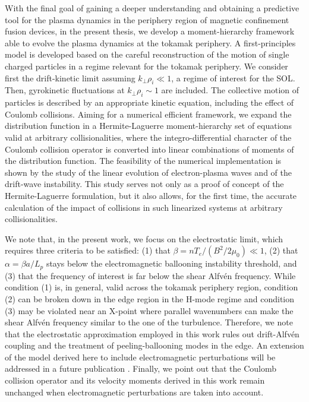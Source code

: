 With the final goal of gaining a deeper understanding and obtaining a predictive tool for the plasma dynamics in the periphery region of magnetic confinement fusion devices, in the present thesis, we develop a moment-hierarchy framework able to evolve the plasma dynamics at the tokamak periphery.
%
A first-principles model is developed based on the careful reconstruction of the motion of single charged particles in a regime relevant for the tokamak periphery.
%
We consider first the drift-kinetic limit assuming $k_\perp \rho_i \ll 1$, a regime of interest for the SOL.
%
Then, gyrokinetic fluctuations at $k_\perp \rho_i \sim 1$ are included.
%
The collective motion of particles is described by an appropriate kinetic equation, including the effect of Coulomb collisions.
%
Aiming for a numerical efficient framework, we expand the distribution function in  a Hermite-Laguerre moment-hierarchy set of equations valid at arbitrary collisionalities, where the integro-differential character of the Coulomb collision operator is converted into linear combinations of moments of the distribution function.
%
The feasibility  of the numerical implementation is shown by the study of the linear evolution of electron-plasma waves and of the drift-wave instability.
%
This study serves not only as a proof of concept of the Hermite-Laguerre formulation, but it also allows, for the first time, the accurate calculation of the impact of collisions in such linearized systems at arbitrary collisionalities.

We note that, in the present work, we focus on the electrostatic limit, which requires three criteria to be satisfied: (1) that $\beta=n T_e/(B^2/2\mu_0) \ll 1$, (2) that $\alpha = \beta a/L_p$ stays below the electromagnetic ballooning instability threshold, and (3) that the frequency of interest is far below the shear Alfvén frequency.
%
While condition (1) is, in general, valid across the tokamak periphery region, condition (2) can be broken down in the edge region in the H-mode regime and condition (3) may be violated near an X-point where parallel wavenumbers can make the shear Alfvén frequency similar to the one of the turbulence.
%
Therefore, we note that the electrostatic approximation employed in this work rules out drift-Alfvén coupling and the treatment of peeling-ballooning modes in the edge.
%
An extension of the model derived here to include electromagnetic perturbations will be addressed in a future publication \citep{Frei2019}.
%
Finally, we point out that the Coulomb collision operator and its velocity moments derived in this work remain unchanged when electromagnetic perturbations are taken into account.

